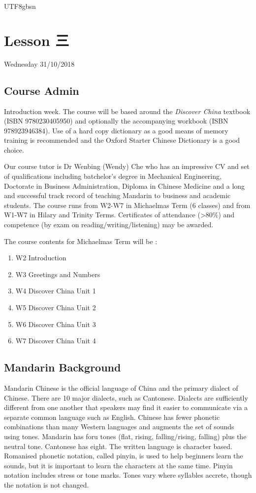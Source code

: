 \documentclass{article}
\newcommand{\myfont}{gbsn} %
\begin{document}
 
\begin{CJK}{UTF8}{\myfont} 
\section{Lesson 三}

Wednesday 31/10/2018

\subsection{Course Admin}

Introduction week.   The course will be based around the {\it Discover China} textbook (ISBN 9780230405950) and optionally the accompanying workbook (ISBN 978923946384).  Use of a hard copy dictionary as a good means of memory training is recommended and the Oxford Starter Chinese Dictionary is a good choice.

Our course tutor is Dr Wenbing (Wendy) Che who has an impressive CV and set of qualifications including batchelor's degree in Mechanical Engineering, Doctorate in Business Administration, Diploma in Chinese Medicine and a long and successful track record of teaching Mandarin to business and academic students.    The course runs from W2-W7 in Michaelmas Term (6 classes) and from W1-W7 in Hilary and Trinity Terms.  Certificates of attendance (>80\%) and competence (by exam on reading/writing/listening) may be awarded.

The course contents for Michaelmas Term will be :

\begin{enumerate}
\item W2 Introduction
\item W3 Greetings and Numbers
\item W4 Discover China Unit 1
\item W5 Discover China Unit 2
\item W6 Discover China Unit 3
\item W7 Discover China Unit 4
\end{enumerate}

\subsection{Mandarin Background}

Mandarin Chinese is the official language of China and the primary dialect of Chinese.  There are 10 major dialects, such as Cantonese.  Dialects are sufficiently different from one another that speakers may find it easier to communicate via a separate common language such as English.   Chinese has fewer phonetic combinations than many Western languages and augments the set of sounds using tones.   Mandarin has foru tones (flat, rising, falling/rising, falling) plus the neutral tone.   Cantonese has eight.   The written language is character based.  Romanised phonetic notation, called pinyin, is used to help beginners learn the sounds, but it is important to learn the characters at the same time.  Pinyin notation includes stress or tone marks.   Tones vary where syllables accrete, though the notation is not changed.


\end{CJK}
\end{document}
